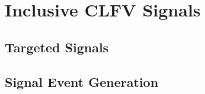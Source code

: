 \chapter{Inclusive CLFV Signals}
\label{chap:Signal}

\section{Targeted Signals}

\section{Signal Event Generation}
